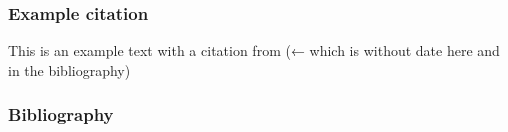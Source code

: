 \documentclass{beamer}
\begin{document}
  \begin{frame}
    \frametitle{Example citation}
    This is an example text with a citation from \citep{burzio1988ItalianSyntaxGovernmentBindingApproach} (← which is without date here and in the bibliography)
  \end{frame}

  \begin{frame}
    \frametitle{Bibliography}
    
  \end{frame}
\end{document}
